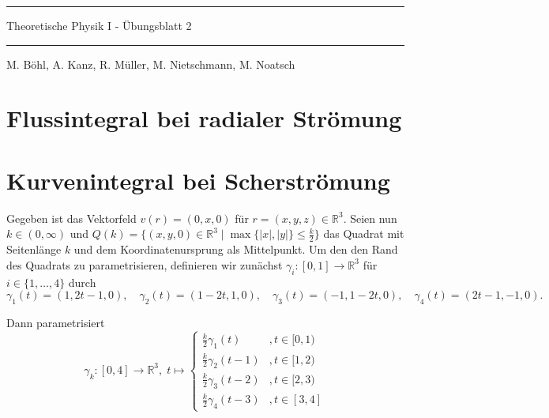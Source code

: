 \documentclass[11pt]{article}
\theoremstyle{plain}
\theoremstyle{definition}
\theoremstyle{remark}
\newcommand{\R}{\mathbb{R}}
\newcommand{\longto}{\longrightarrow}
\begin{document}
\pagestyle{fancy}
\thispagestyle{plain}

\rule{\textwidth}{.5pt}
\begin{center}
\Huge{Theoretische Physik I - Übungsblatt 2}
\end{center}

\rule{\textwidth}{.5pt}
\text{} \hfill M. Böhl, A. Kanz, R. Müller, M. Nietschmann, M. Noatsch




\section{Flussintegral bei radialer Strömung}



\section{Kurvenintegral bei Scherströmung}
Gegeben ist das Vektorfeld $v(r) = (0, x, 0)$ für $r = (x,y,z) \in \R^3$. Seien nun $k \in (0, \infty)$ und $Q(k) = \{ (x,y,0) \in \R^3 \mid \max \{ |x|,|y| \} \leq \frac{k}{2} \}$ das Quadrat mit Seitenlänge $k$ und dem Koordinatenursprung als Mittelpunkt. Um den den Rand des Quadrats zu parametrisieren, definieren wir zunächst $\gamma_i : [0,1] \longto \R^3$ für $i \in \{1,\dots, 4\}$ durch
\[ \gamma_1 (t) = (1, 2t-1, 0), \quad \gamma_2 (t) = (1-2t, 1, 0), \quad \gamma_3 (t) = (-1, 1-2t, 0), \quad \gamma_4 (t) = (2t-1, -1, 0). \]

Dann parametrisiert
\[ \gamma_k: [0,4] \longto \R^3,\; t \longmapsto \begin{cases}
\tfrac{k}{2}\gamma_1(t) &, t \in [0,1)\\
\tfrac{k}{2}\gamma_2(t-1) &, t \in [1,2)\\
\tfrac{k}{2}\gamma_3(t-2) &, t \in [2,3)\\
\tfrac{k}{2}\gamma_4(t-3) &, t \in [3,4]
\end{cases} \]
\end{document}
